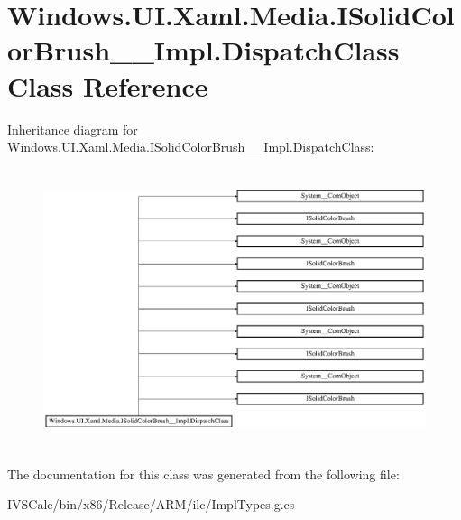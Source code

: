 \hypertarget{class_windows_1_1_u_i_1_1_xaml_1_1_media_1_1_i_solid_color_brush_____impl_1_1_dispatch_class}{}\section{Windows.\+U\+I.\+Xaml.\+Media.\+I\+Solid\+Color\+Brush\+\_\+\+\_\+\+Impl.\+Dispatch\+Class Class Reference}
\label{class_windows_1_1_u_i_1_1_xaml_1_1_media_1_1_i_solid_color_brush_____impl_1_1_dispatch_class}
Inheritance diagram for Windows.\+U\+I.\+Xaml.\+Media.\+I\+Solid\+Color\+Brush\+\_\+\+\_\+\+Impl.\+Dispatch\+Class\+:\begin{figure}[H]
\begin{center}
\leavevmode
\includegraphics[height=8.213333cm]{class_windows_1_1_u_i_1_1_xaml_1_1_media_1_1_i_solid_color_brush_____impl_1_1_dispatch_class}
\end{center}
\end{figure}


The documentation for this class was generated from the following file\+:\begin{DoxyCompactItemize}
\item 
I\+V\+S\+Calc/bin/x86/\+Release/\+A\+R\+M/ilc/Impl\+Types.\+g.\+cs\end{DoxyCompactItemize}
